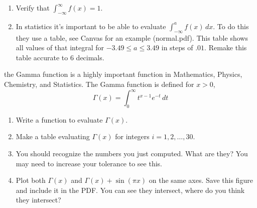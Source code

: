 \documentclass[11pt,letterpaper]{article}
\begin{document}
\begin{enumerate}
 \item Verify that $\displaystyle\int_{-\infty}^\infty f(x) = 1$.
 \item In statistics it's important to be able to evaluate $\int_{-\infty}^a f(x)\,dx$. To do this
they use a table, see Canvas for an example (normal.pdf). This table shows all values of that
integral for $-3.49\le a\le 3.49$ in steps of $.01$. Remake this table accurate to 6 decimals.
\end{enumerate}




\begin{problem}
 the Gamma function is a highly important function in Mathematics, Physics, Chemistry, and 
Statistics. The Gamma function is defined for $x>0$,
\[
 \Gamma(x) = \int_0^\infty t^{x-1}e^{-t}\,dt
\]

\begin{enumerate}
 \item Write a function to evaluate $\Gamma(x)$.
 \item Make a table evaluating $\Gamma(x)$ for integers $i=1,2,\dots,30$. 
 \item You should recognize the numbers you just computed. What are they? You may need to 
increase your tolerance to see this.
 \item Plot both $\Gamma(x)$ and $\Gamma(x)+\sin(\pi x)$ on the same axes. Save this figure 
and include it in the PDF. You can see they intersect, where do you think they intersect?
\end{enumerate}



\end{problem}
\end{document}
